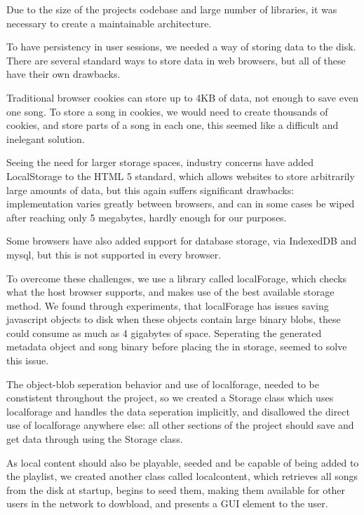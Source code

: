 Due to the size of the projects codebase and large number of libraries, it was necessary to create a maintainable architecture.



To have persistency in user sessions, we needed a way of storing data to the disk. There are several standard ways to store data in web browsers, but all of these have their own drawbacks.

Traditional browser cookies can store up to 4KB of data, 
not enough to save even one song. 
To store a song in cookies, 
we would need to create thousands of cookies, 
and store parts of a song in each one, 
this seemed like a difficult and inelegant solution.

Seeing the need for larger storage spaces, 
industry concerns have added LocalStorage to the HTML 5 standard,
which allows websites to store arbitrarily large amounts of data,
but this again suffers significant drawbacks: 
implementation varies greatly between browsers, 
and can in some cases be wiped after reaching only 5 megabytes, 
hardly enough for our purposes.

Some browsers have also added support for database storage, via IndexedDB and mysql, but this is not supported in every browser.

To overcome these challenges, we use a library called localForage, 
which checks what the host browser supports,
and makes use of the best available storage method.
We found through experiments,
that localForage has issues saving javascript objects to disk when these objects contain large binary blobs, 
these could consume as much as 4 gigabytes of space.
Seperating the generated metadata object and song binary before placing the in storage, 
seemed to solve this issue.

The object-blob seperation behavior and use of localforage,
needed to be constistent throughout the project, 
so we created a Storage class which uses localforage and handles the data seperation implicitly, 
and disallowed the direct use of localforage anywhere else: all other sections of the project should save and get data through using the Storage class.

As local content should also be playable, 
seeded and be capable of being added to the playlist, 
we created another class called localcontent,
which retrieves all songs from the disk at startup,
begins to seed them, making them available for other users in the network to dowbload,
and presents a GUI element to the user.


